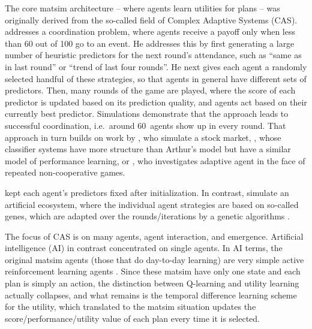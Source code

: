 







The core \acrshort{matsim} architecture -- where agents learn utilities for plans -- was originally derived from the so-called field of Complex Adaptive Systems (CAS).  
%
\cite{ArthurBar} addresses a coordination problem, where agents receive a payoff only when less than 60 out of 100 go to an event.  He addresses this by first generating a large number of heuristic predictors for the next round's attendance, such as ``same as in last round'' or ``trend of last four rounds''.  He next gives each agent a randomly selected handful of these strategies, so that agents in general have different sets of predictors.  Then, many rounds of the game are played, where the score of each predictor is updated based on its prediction quality, and agents act based on their currently best predictor.  Simulations demonstrate that the approach leads to successful coordination, i.e.\ around 60~agents show up in every round.
%
That approach in turn builds on work by \cite{PalmerEtAl_PhysicaD_1994}, who simulate a stock market,  \cite{Holland_1992}, whose classifier systems have more structure than Arthur's model but have a similar model of performance learning, or \cite{AxelrodBook}, who investigates adaptive agent in the face of repeated non-cooperative games.  

\citet{ArthurBar} kept each agent's predictors fixed after initialization.  In contrast,
\cite{HraberJonesForrestEcho} simulate an artificial ecosystem, where the individual agent strategies are based on so-called genes, which are adapted over the rounds/iterations by a genetic algorithms \citep{Goldberg_1989}.

The focus of CAS is on many agents, agent interaction, and emergence.  Artificial intelligence (AI) in contrast concentrated on single agents.  In AI terms, the original \acrshort{matsim} agents (those that do day-to-day learning) are very simple active reinforcement learning agents \citep[][Chapter 21.3]{RusselNorvig2010ArtificialIntelligence}.  Since these \acrshort{matsim} have only one state and each plan is simply an action, the distinction between Q-learning and utility learning actually collapses, and what remains is the temporal difference learning scheme for the utility, which translated to the \acrshort{matsim} situation updates the score/performance/utility value of each plan every time it is selected.

